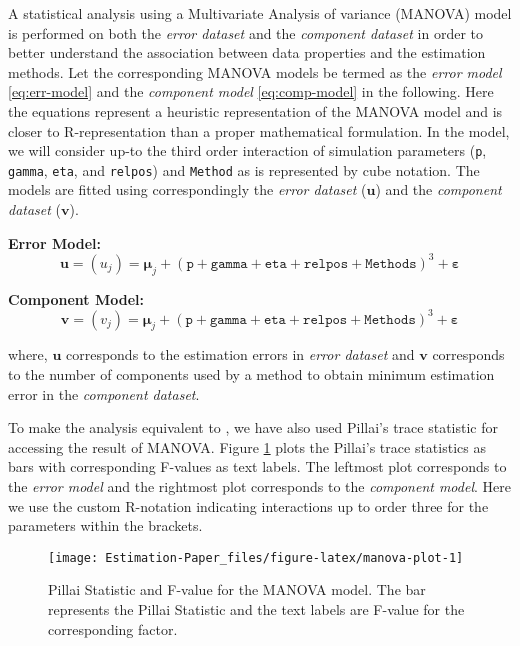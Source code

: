 \documentclass[12pt,3p,authoryear]{elsarticle}
\begin{document}
A statistical analysis using a Multivariate Analysis of variance (MANOVA) model is performed on both the \emph{error dataset} and the \emph{component dataset} in order to better understand the association between data properties and the estimation methods. Let the corresponding MANOVA models be termed as the \emph{error model} \eqref{eq:err-model} and the \emph{component model} \eqref{eq:comp-model} in the following. Here the equations represent a heuristic representation of the MANOVA model and is closer to R-representation than a proper mathematical formulation. In the model, we will consider up-to the third order interaction of simulation parameters (\texttt{p}, \texttt{gamma}, \texttt{eta}, and \texttt{relpos}) and \texttt{Method} as is represented by cube notation. The models are fitted using correspondingly the \emph{error dataset} (\(\mathbf{u}\)) and the \emph{component dataset} (\(\mathbf{v}\)).

\textbf{Error Model:}
\begin{equation}
  \mathbf{u} = \left(u_j\right) = \boldsymbol{\mu}_j +
  (\texttt{p} + \texttt{gamma} + \texttt{eta} +
    \texttt{relpos} + \texttt{Methods})^3 +
    \boldsymbol{\varepsilon}
  \label{eq:err-model}
\end{equation}

\textbf{Component Model:}
\begin{equation}
  \mathbf{v} = \left(v_j\right) = \boldsymbol{\mu}_j +
  (\texttt{p} + \texttt{gamma} + \texttt{eta} +
    \texttt{relpos} + \texttt{Methods})^3 +
    \boldsymbol{\varepsilon}
  \label{eq:comp-model}
\end{equation}

where, \(\mathbf{u}\) corresponds to the estimation errors in \emph{error dataset} and \(\mathbf{v}\) corresponds to the number of components used by a method to obtain minimum estimation error in the \emph{component dataset}.

To make the analysis equivalent to \citet{rimal2019pred}, we have also used Pillai's trace statistic for accessing the result of MANOVA. Figure \ref{fig:manova-plot} plots the Pillai's trace statistics as bars with corresponding F-values as text labels. The leftmost plot corresponds to the \emph{error model} and the rightmost plot corresponds to the \emph{component model}. Here we use the custom R-notation indicating interactions up to order three for the parameters within the brackets.



\begin{figure}[H]
\texttt{[image: Estimation-Paper\_files/figure-latex/manova-plot-1]} \caption{Pillai Statistic and F-value for the MANOVA model. The bar represents the Pillai Statistic and the text labels are F-value for the corresponding factor.}\label{fig:manova-plot}
\end{figure}
\end{document}
